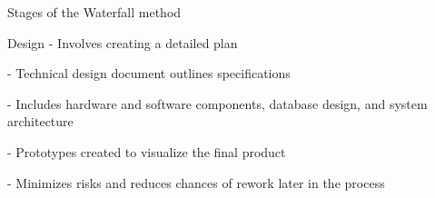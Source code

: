 \begin{frame}{Stages of the Waterfall method}
    \begin{block}{Design}
    - Involves creating a detailed plan 
    
    - Technical design document outlines specifications 
    
    - Includes hardware and software components, database design, and system architecture
    
    - Prototypes created to visualize the final product 
    
    
    - Minimizes risks and reduces chances of rework later in the process
    \end{block}    
\end{frame}